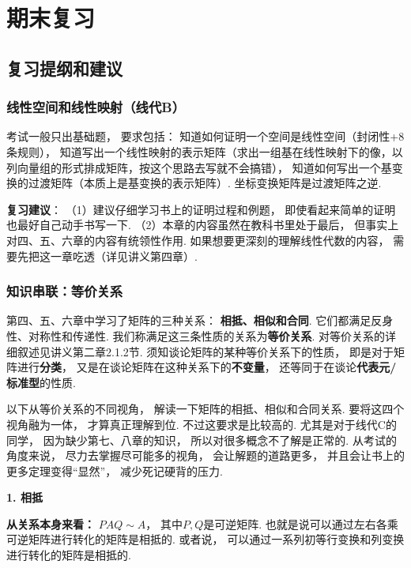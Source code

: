 \clearpage

\section{期末复习}

\subsection{复习提纲和建议}

\subsubsection{线性空间和线性映射（线代B）}

考试一般只出基础题，
要求包括：
知道如何证明一个空间是线性空间（封闭性+8条规则），
知道写出一个线性映射的表示矩阵（求出一组基在线性映射下的像，以列向量组的形式排成矩阵，按这个思路去写就不会搞错），
知道如何写出一个基变换的过渡矩阵（本质上是基变换的表示矩阵）.
坐标变换矩阵是过渡矩阵之逆.

\textbf{复习建议}：
（1）建议仔细学习书上的证明过程和例题，
即使看起来简单的证明也最好自己动手书写一下.
（2）本章的内容虽然在教科书里处于最后，
但事实上对四、五、六章的内容有统领性作用.
如果想要更深刻的理解线性代数的内容，
需要先把这一章吃透（详见讲义第四章）.

\subsubsection{知识串联：等价关系}

第四、五、六章中学习了矩阵的三种关系：
\textbf{相抵、相似和合同}.
它们都满足反身性、对称性和传递性.
我们称满足这三条性质的关系为\textbf{等价关系}.
对等价关系的详细叙述见讲义第二章2.1.2节.
须知谈论矩阵的某种等价关系下的性质，
即是对于矩阵进行\textbf{分类}，
又是在谈论矩阵在这种关系下的\textbf{不变量}，
还等同于在谈论\textbf{代表元/标准型}的性质.

以下从等价关系的不同视角，
解读一下矩阵的相抵、相似和合同关系.
要将这四个视角融为一体，
才算真正理解到位.
不过这要求是比较高的.
尤其是对于线代C的同学，
因为缺少第七、八章的知识，
所以对很多概念不了解是正常的.
从考试的角度来说，
尽力去掌握尽可能多的视角，
会让解题的道路更多，
并且会让书上的更多定理变得“显然”，
减少死记硬背的压力.



\medskip

\textbf{1. 相抵}

\textbf{从关系本身来看：}
$PAQ \sim A$，
其中$P,Q$是可逆矩阵.
也就是说可以通过左右各乘可逆矩阵进行转化的矩阵是相抵的.
或者说，
可以通过一系列初等行变换和列变换进行转化的矩阵是相抵的.

